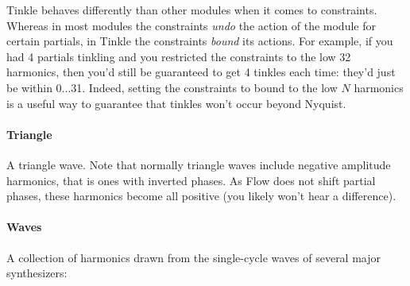 \documentclass{article}
\newcommand\name{Flow}
\begin{document}
Tinkle behaves differently than other modules when it comes to constraints.  Whereas in most modules the constraints {\it undo} the action of the module for certain partials, in Tinkle the constraints {\it bound} its actions.  For example, if you had 4 partials tinkling and you restricted the constraints to the low 32 harmonics, then you'd still be guaranteed to get 4 tinkles each time: they'd just be within 0...31.  Indeed, setting the constraints to bound to the low \(N\) harmonics is a useful way to guarantee that tinkles won't occur beyond Nyquist.

\paragraph{Triangle}  A triangle wave.  Note that normally triangle waves include negative amplitude harmonics, that is ones with inverted phases.  As {\name} does not shift partial phases, these harmonics become all positive (you likely won't hear a difference).

\paragraph{Waves}  A collection of harmonics drawn from the single-cycle waves of several major synthesizers:
\end{document}
